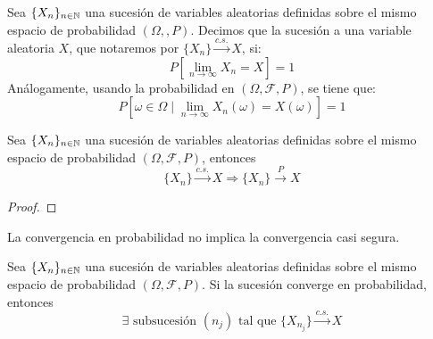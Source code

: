 \begin{definicion}
    Sea $\{X_n\}_{n\in \mathbb{N}}$ una sucesión de variables aleatorias definidas sobre el mismo espacio de probabilidad $(\Omega, \mathcal, P)$. Decimos que la sucesión  a una variable aleatoria $X$, que notaremos por $\{X_n\} \xrightarrow{c.s.} X$, si:
    \begin{equation*}
        P\left[\lim_{n\to \infty} X_n = X\right] = 1
    \end{equation*}
    Análogamente, usando la probabilidad en $(\Omega, \mathcal{F}, P)$, se tiene que:
    \begin{equation*}
        P\left[\omega\in \Omega\mid \lim_{n\to \infty} X_n(\omega) = X(\omega)\right] = 1
    \end{equation*}
\end{definicion}

\begin{prop}
    Sea $\{X_n\}_{n\in \mathbb{N}}$ una sucesión de variables aleatorias definidas sobre el mismo espacio de probabilidad $(\Omega, \mathcal{F}, P)$, entonces
    \begin{equation*}
        \{X_n\} \xrightarrow{c.s.} X \Longrightarrow \{X_n\} \xrightarrow{P} X 
    \end{equation*}
    \begin{proof}
    \end{proof}
\end{prop}
\begin{observacion}
    La convergencia en probabilidad no implica la convergencia casi segura.
\end{observacion}
\begin{prop}
    Sea $\{X_n\}_{n\in \mathbb{N}}$ una sucesión de variables aleatorias definidas sobre el mismo espacio de probabilidad $(\Omega, \mathcal{F}, P)$. Si la sucesión converge en probabilidad, entonces 
    \begin{equation*}
        \exists \text{ subsucesión } (n_j) \text{ tal que } \{X_{n_j}\} \xrightarrow{c.s.} X
    \end{equation*}
\end{prop}

